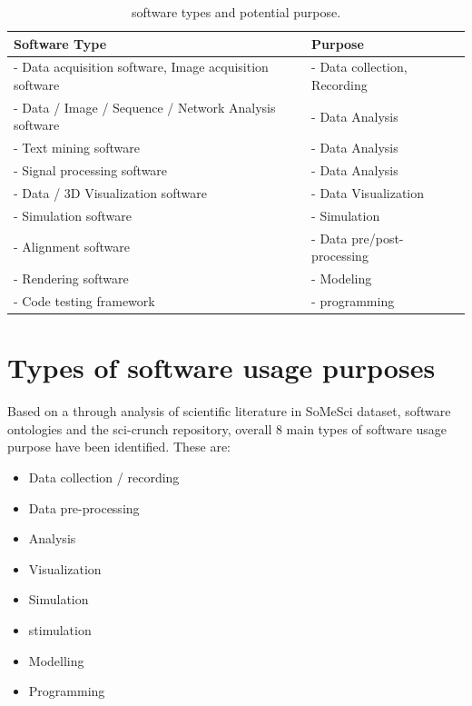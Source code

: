 \begin{table}[h!]
	\begin{center}
		\caption{software types and potential purpose.}
		\label{tab:table1}
		\begin{tabular}{|l|l|} %
			\hline
			\textbf{Software Type} & \textbf{Purpose} \\
			\hline
			- Data acquisition software, Image acquisition software  & - Data collection, Recording  \\
			\hline
			- Data / Image  / Sequence  / Network  Analysis software  & - Data Analysis  \\
			\hline
			- Text mining software  & - Data Analysis  \\
			\hline
			- Signal processing software  & - Data Analysis  \\
			\hline
			- Data / 3D Visualization software & - Data Visualization  \\
			\hline
			- Simulation software  & - Simulation  \\
			\hline
			- Alignment software  & - Data pre/post-processing \\
			\hline
			- Rendering software  & - Modeling  \\
			\hline
			-	Code testing framework   & - programming  \\
			\hline
		\end{tabular}
	\end{center}
\end{table}


\section{Types of software usage purposes }
\label{sec:purpose:Types}

Based on a through analysis of scientific literature in \ac{SoMeSci} dataset, software ontologies and the sci-crunch repository, overall 8 main types of software usage purpose have been identified. These are: 

\begin{itemize}
	\itemsep0em
	\item Data collection / recording  
	\item Data pre-processing
	\item Analysis 
	\item Visualization
	\item Simulation
	\item stimulation 
	\item Modelling
	\item Programming
\end{itemize}

